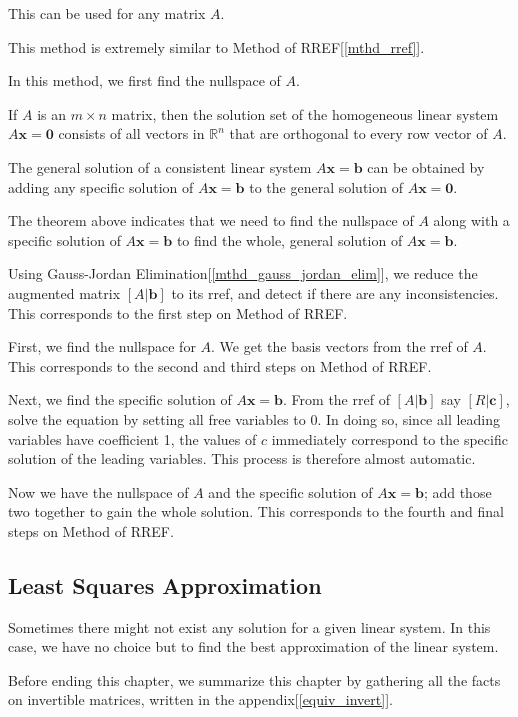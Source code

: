 \documentclass{report}
\begin{document}
			This can be used for any matrix $A$.
			
			This method is extremely similar to Method of RREF[\ref{mthd_rref}].
			
			In this method, we first find the nullspace of $A$.
			
			\begin{thm}
				If $A$ is an $m \times n$ matrix, then the solution set of the homogeneous linear system $A\bm{x}=\bm{0}$ consists of all vectors in $\mathbb{R}^n$ that are orthogonal to every row vector of $A$.
			\end{thm}
			
			\begin{thm}
				The general solution of a consistent linear system $A\bm{x}=\bm{b}$ can be obtained by adding any specific solution of $A\bm{x}=\bm{b}$ to the general solution of $A\bm{x}=\bm{0}$.
			\end{thm}
			
			The theorem above indicates that we need to find the nullspace of $A$ along with a specific solution of $A\bm{x}=\bm{b}$ to find the whole, general solution of $A\bm{x}=\bm{b}$.
			
			Using Gauss-Jordan Elimination[\ref{mthd_gauss_jordan_elim}], we reduce the augmented matrix $\left[A|\bm{b}\right]$ to its rref, and detect if there are any inconsistencies. This corresponds to the first step on Method of RREF.
			
			First, we find the nullspace for $A$. We get the basis vectors from the rref of $A$. This corresponds to the second and third steps on Method of RREF.
			
			Next, we find the specific solution of $A\bm{x}=\bm{b}$. From the rref of $\left[A|\bm{b}\right]$ say $\left[R|\bm{c}\right]$, solve the equation by setting all free variables to 0. In doing so, since all leading variables have coefficient 1, the values of $c$ immediately correspond to the specific solution of the leading variables. This process is therefore almost automatic.
			
			Now we have the nullspace of $A$ and the specific solution of $A\bm{x}=\bm{b}$; add those two together to gain the whole solution. This corresponds to the fourth and final steps on Method of RREF.
			
		\subsection{Least Squares Approximation}%
			Sometimes there might not exist any solution for a given linear system. In this case, we have no choice but to find the best approximation of the linear system.
		
	
	Before ending this chapter, we summarize this chapter by gathering all the facts on invertible matrices, written in the appendix[\ref{equiv_invert}].
\end{document}
